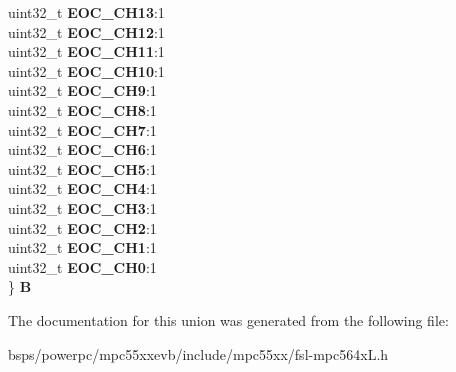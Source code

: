 \begin{DoxyCompactItemize}
\begin{tabbing}
\>uint32\_t {\bfseries EOC\_CH13}:1\\
\>uint32\_t {\bfseries EOC\_CH12}:1\\
\>uint32\_t {\bfseries EOC\_CH11}:1\\
\>uint32\_t {\bfseries EOC\_CH10}:1\\
\>uint32\_t {\bfseries EOC\_CH9}:1\\
\>uint32\_t {\bfseries EOC\_CH8}:1\\
\>uint32\_t {\bfseries EOC\_CH7}:1\\
\>uint32\_t {\bfseries EOC\_CH6}:1\\
\>uint32\_t {\bfseries EOC\_CH5}:1\\
\>uint32\_t {\bfseries EOC\_CH4}:1\\
\>uint32\_t {\bfseries EOC\_CH3}:1\\
\>uint32\_t {\bfseries EOC\_CH2}:1\\
\>uint32\_t {\bfseries EOC\_CH1}:1\\
\>uint32\_t {\bfseries EOC\_CH0}:1\\
\} {\bfseries B}\\

\end{tabbing}\end{DoxyCompactItemize}


The documentation for this union was generated from the following file\+:\begin{DoxyCompactItemize}
\item 
bsps/powerpc/mpc55xxevb/include/mpc55xx/fsl-\/mpc564x\+L.\+h\end{DoxyCompactItemize}
